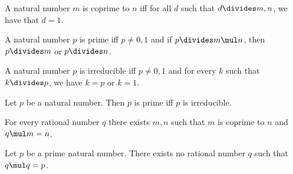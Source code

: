 \begin{definition}
  A natural number $m$ is coprime to $n$ iff for all $d$ such that
  $d\divides m, n$, we have that $d = 1$.
\end{definition}

\begin{definition}
  A natural number $p$ is prime iff $p\neq 0,1$ and
  if $p\divides m\mul n$, then $p\divides m$ or $p\divides n$.
\end{definition}

\begin{definition}
  A natural number $p$ is irreducible iff $p\neq 0,1$ and for every $k$
  such that $k\divides p$, we have $k = p$ or $k = 1$.
\end{definition}

\begin{theorem}
  Let $p$ be a natural number.
  Then $p$ is prime iff $p$ is irreducible.
\end{theorem}

\begin{theorem}
  For every rational number $q$ there exists $m, n$
  such that $m$ is coprime to $n$ and $q\mul m = n$.
\end{theorem}

\begin{theorem}
  Let $p$ be a prime natural number.
  There exists no rational number $q$
  such that $q\mul q = p$.
\end{theorem}
